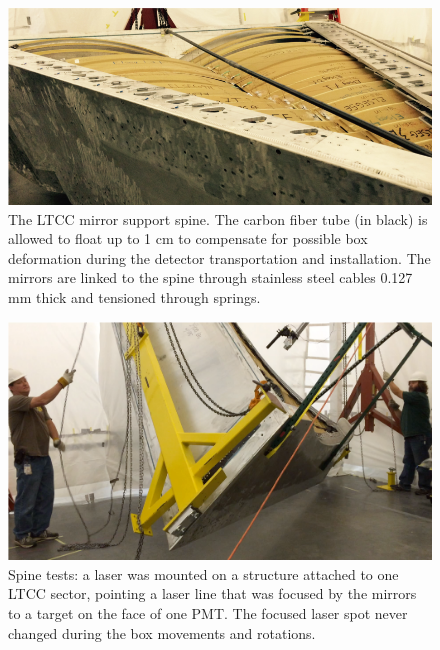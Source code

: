 \begin{figure}
	\centering
	\includegraphics[width=1.0\columnwidth,keepaspectratio]{img/spine.png}
	\caption{The LTCC mirror support spine. The carbon fiber tube (in black) is allowed to float up to 1 cm to compensate
             for possible box deformation during the detector transportation and installation. The mirrors are linked to
             the spine through stainless steel cables 0.127 mm thick and tensioned through springs.}
	\label{fig:spine}
\end{figure}


\begin{figure}
	\centering
	\includegraphics[width=1.0\columnwidth,keepaspectratio]{img/spineTest.png}
	\caption{Spine tests: a laser was mounted on a structure attached to one LTCC sector, pointing a laser line that was focused by the mirrors to a
            target on the face of one PMT. The focused laser spot never changed during the box movements and rotations.}
	\label{fig:spineTest}
\end{figure}





